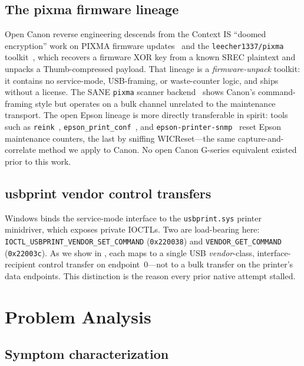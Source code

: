 \documentclass[conference]{IEEEtran}
\begin{document}
\subsection{The pixma firmware lineage}
\label{sec:bg-pixma}

Open Canon reverse engineering descends from the Context IS ``doomed
encryption'' work on PIXMA firmware updates~\cite{contextis-canon} and the
\texttt{leecher1337/pixma} toolkit~\cite{leecher-pixma}, which recovers a
firmware XOR key from a known SREC plaintext and unpacks a Thumb-compressed
payload. That lineage is a \emph{firmware-unpack} toolkit: it contains no
service-mode, USB-framing, or waste-counter logic, and ships without a
license. The SANE \texttt{pixma} scanner backend~\cite{sane-pixma} shows
Canon's command-framing style but operates on a bulk channel unrelated to
the maintenance transport. The open Epson lineage is more directly
transferable in spirit: tools such as \texttt{reink}~\cite{reink-elena},
\texttt{epson\_print\_conf}~\cite{ircama-epson-print-conf}, and
\texttt{epson-printer-snmp}~\cite{zedeldi-epson-snmp} reset Epson
maintenance counters, the last by sniffing WICReset---the same
capture-and-correlate method we apply to Canon. No open Canon G-series
equivalent existed prior to this work.

\subsection{usbprint vendor control transfers}
\label{sec:bg-usbprint}

Windows binds the service-mode interface to the \texttt{usbprint.sys}
printer minidriver, which exposes private IOCTLs. Two are load-bearing
here: \texttt{IOCTL\_USBPRINT\_VENDOR\_SET\_COMMAND} (\texttt{0x220038})
and \texttt{VENDOR\_GET\_COMMAND} (\texttt{0x22003c}). As we show in
, each maps to a single USB \emph{vendor}-class,
interface-recipient control transfer on endpoint~0---not to a bulk
transfer on the printer's data endpoints. This distinction is the reason
every prior native attempt stalled.

\section{Problem Analysis}
\label{sec:problem}

\subsection{Symptom characterization}
\label{sec:problem-symptom}
\end{document}
